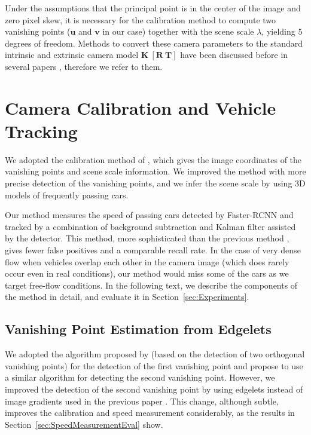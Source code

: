 \documentclass[]{elsarticle}
\begin{document}
Under the assumptions that the principal point is in the center of the image and zero pixel skew, it is necessary for the calibration method to compute two vanishing points ($\mathbf{u}$ and $\mathbf{v}$ in our case) together with the scene scale $\lambda$, yielding 5 degrees of freedom.
Methods to convert these camera parameters to the standard intrinsic and extrinsic camera model $\mathbf{K~[R~T]}$ have been discussed before in several papers \citep{Zhang2013Calib,Fung2003,Zheng2014}, therefore we refer to them.



\section{Camera Calibration and Vehicle Tracking} \label{sec:Methodology}

We adopted the calibration method of \cite{Dubska2014}, which gives the image coordinates of the vanishing points and scene scale information. We improved the method with more precise detection of the vanishing points, and we infer the scene scale by using 3D models of frequently passing cars.

Our method measures the speed of passing cars detected by Faster-RCNN \citep{Girshick2015} and tracked by a combination of background subtraction and Kalman filter \citep{Kalman1960} assisted by the detector. This method, more sophisticated than the previous method \citep{Dubska2014}, gives fewer false positives and a comparable recall rate. In the case of very dense flow when vehicles overlap each other in the camera image (which does rarely occur even in real conditions), our method would miss some of the cars as we target free-flow conditions.
In the following text, we describe the components of the method in detail, and evaluate it in Section~\ref{sec:Experiments}.



\subsection{Vanishing Point Estimation from Edgelets} \label{sec:VPEstimation}
We adopted the algorithm proposed by \cite{Dubska2015ITS} (based on the detection of two orthogonal vanishing points) for the detection of the first vanishing point and propose to use a similar algorithm for detecting the second vanishing point. However, we improved the detection of the second vanishing point by using edgelets instead of image gradients used in the previous paper \citep{Dubska2015ITS}.  This change, although subtle, improves the calibration and speed measurement considerably, as the results in Section~\ref{sec:SpeedMeasurementEval} show.
\end{document}
